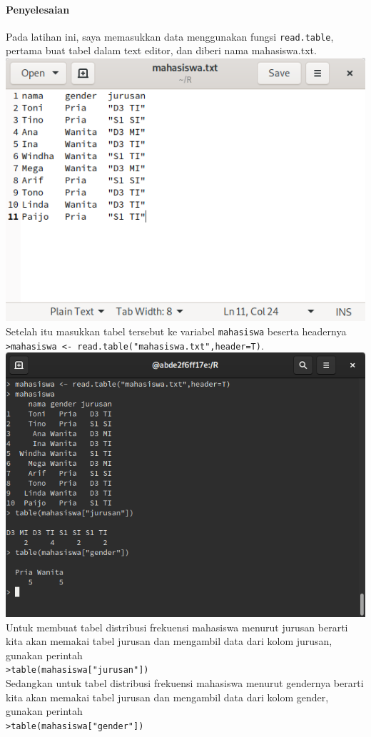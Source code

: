 \documentclass[a4paper,12pt]{article}
\begin{document}
\paragraph{Penyelesaian\\}
Pada latihan ini, saya memasukkan data menggunakan fungsi \texttt{read.table}, pertama buat tabel dalam text editor, dan diberi nama mahasiswa.txt.\\
\includegraphics[width=\linewidth]{mahasiswatxt}
Setelah itu masukkan tabel tersebut ke variabel \texttt{mahasiswa} beserta headernya\\
\texttt{>mahasiswa <- read.table("mahasiswa.txt",header=T)}.\\
\includegraphics[width=\linewidth]{5}
Untuk membuat tabel distribusi frekuensi mahasiswa menurut jurusan berarti kita akan memakai tabel jurusan dan mengambil data dari kolom jurusan, gunakan perintah\\
\texttt{>table(mahasiswa["jurusan"])}\\
Sedangkan untuk tabel distribusi frekuensi mahasiswa menurut gendernya berarti kita akan memakai tabel jurusan dan mengambil data dari kolom gender, gunakan perintah\\
\texttt{>table(mahasiswa["gender"])}\\
\newpage 
\end{document}
